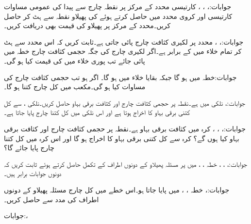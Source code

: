 جوابات:، ، ، 
کارتیسی محدد کے مرکز  پر نقطہ چارج  سے پیدا  کی عمومی مساوات کارتیسی اور کروی محدد میں حاصل کرتے ہوئے  کی پھیلاو نقطہ  سے ہٹ کر حاصل کریں۔محدد کے مرکز پر پھیلاو کی قیمت بھی دریافت کریں۔  

جوابات:، ،
 محدد پر لکیری کثافت چارج  پائی جاتی ہے۔ثابت کریں کہ اس محدد سے ہٹ کر تمام خلاء میں  کے برابر ہے۔اگر لکیری چارج کی جگہ حجمی کثافت چارج  خطہ  میں پائی جائے تب پوری خلاء میں  کی قیمت کیا ہو گی۔

جوابات:خطہ  میں  ہو گا جبکہ بقایا خلاء میں  ہو گا۔
اگر  ہو تب حجمی کثافت چارج کی مساوات کیا ہو گی۔مکعب  میں کل چارج کتنا ہو گا۔

جوابات:، 
نلکی  میں  ہے۔نقطہ  پر حجمی کثافت چارج اور کثافت برقی بہاو حاصل کریں۔نلکی ،  سے کل کتنی برقی بہاو کا اخراج ہوتا ہے اور اس نلکی میں کل کتنا چارج پایا جاتا ہے۔

جوابات:، ، ،
کرہ  میں کثافت برقی بہاو  ہے۔نقطہ  پر حجمی کثافت چارج اور کثافت برقی بہاو کیا ہوں گے؟ کرہ  سے کل کتنی برقی بہاو کا اخراج ہو گا اور اس کرہ میں کل کتنا چارج پایا جائے گا؟

جوابات:، ، ، 
خطہ ، ،  میں  پر مسئلہ پھیلاو کے دونوں اطراف کے تکمل حاصل کرتے ہوئے ثابت کریں کہ دونوں جوابات برابر ہیں۔

جوابات:،  
خطہ ، ،  میں  پایا جاتا ہو۔اس خطے میں کل چارج مسئلہ پھیلاو کے دونوں اطراف کی مدد سے حاصل کریں۔

جوابات:، 
